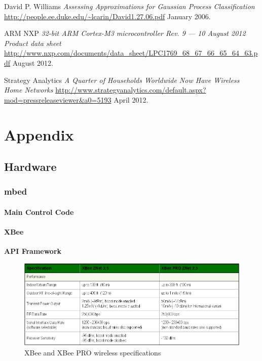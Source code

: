 \documentclass[10.5pt,a4paper,twoside]{report}   %
\begin{document}
\begin{thebibliography}{1}
 David P. Williams {\em Assessing Approximations for Gaussian Process Classification} \url{http://people.ee.duke.edu/~lcarin/David1.27.06.pdf} January 2006.

 ARM NXP {\em 32-bit ARM Cortex-M3 microcontroller Rev. 9 — 10 August 2012 Product data sheet} \url{http://www.nxp.com/documents/data_sheet/LPC1769_68_67_66_65_64_63.pdf} August 2012.

 Strategy Analytics {\em A Quarter of Households Worldwide Now Have Wireless Home Networks} \url{http://www.strategyanalytics.com/default.aspx?mod=pressreleaseviewer&a0=5193} April 2012.

\end{thebibliography}

\chapter{Appendix}
\section{Hardware}
\subsection{mbed}
\subsubsection{Main Control Code}
\label{sec:wificonnect}




\subsubsection{XBee}
\label{sec:xbee}
\textbf{API Framework}


\begin{figure}[h!]
  \vspace{-10pt}
  \caption{XBee and XBee PRO wireless specifications}
  \centering
    \includegraphics[width=1\textwidth]{images/xbeefig.png}
  \vspace{-10pt}
\end{figure}
\end{document}
